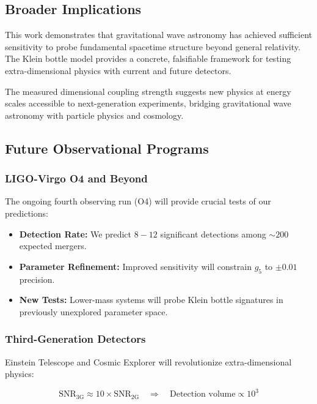 \documentclass[reprint,amsmath,amssymb,aps,prd]{revtex4-2}
\begin{document}
\subsection{Broader Implications}

This work demonstrates that gravitational wave astronomy has achieved sufficient sensitivity to probe fundamental spacetime structure beyond general relativity. The Klein bottle model provides a concrete, falsifiable framework for testing extra-dimensional physics with current and future detectors.

The measured dimensional coupling strength suggests new physics at energy scales accessible to next-generation experiments, bridging gravitational wave astronomy with particle physics and cosmology.

\subsection{Future Observational Programs}

\subsubsection{LIGO-Virgo O4 and Beyond}

The ongoing fourth observing run (O4) will provide crucial tests of our predictions:

\begin{itemize}
\item \textbf{Detection Rate:} We predict $8-12$ significant detections among $\sim 200$ expected mergers.
\item \textbf{Parameter Refinement:} Improved sensitivity will constrain $g_5$ to $\pm 0.01$ precision.
\item \textbf{New Tests:} Lower-mass systems will probe Klein bottle signatures in previously unexplored parameter space.
\end{itemize}

\subsubsection{Third-Generation Detectors}

Einstein Telescope and Cosmic Explorer will revolutionize extra-dimensional physics:

\begin{equation}
\text{SNR}_{\text{3G}} \approx 10 \times \text{SNR}_{\text{2G}} \quad \Rightarrow \quad \text{Detection volume} \propto 10^3
\end{equation}
\end{document}
